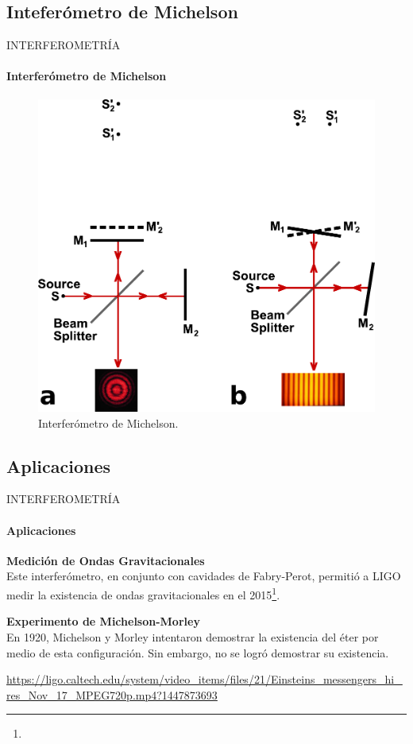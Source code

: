 \subsection{Inteferómetro de Michelson}
\begin{frame}{INTERFEROMETRÍA}
	\framesubtitle{Interferómetro de Michelson}
  \begin{figure}
    \includegraphics[scale=0.34]{juanse/michelson.pdf}
    \caption{Interferómetro de Michelson\footnotemark{}.}
  \end{figure}
  \vspace{-5mm}
\end{frame}




\subsection{Aplicaciones}

\begin{frame}{INTERFEROMETRÍA}
\framesubtitle{Aplicaciones}
\begin{multicols}{2}
	\textbf{Medición de Ondas Gravitacionales\\}
	Este interferómetro, en conjunto con cavidades de Fabry-Perot, permitió a LIGO medir la existencia de ondas gravitacionales
	en el 2015\footnote{}.
	\vfill\null

	\textbf{Experimento de Michelson-Morley\\}
	En 1920, Michelson y Morley intentaron demostrar la existencia del éter por medio de esta configuración. Sin embargo, no se logró demostrar su existencia.
\end{multicols}
\url{https://ligo.caltech.edu/system/video_items/files/21/Einsteins_messengers_hi_res_Nov_17_MPEG720p.mp4?1447873693}
\end{frame}

